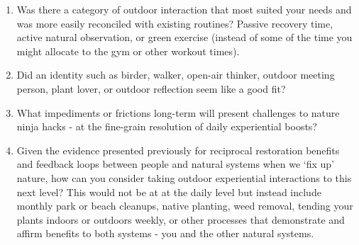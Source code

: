\documentclass[
]{book}
\providecommand{\tightlist}{%
  \setlength{\itemsep}{0pt}\setlength{\parskip}{0pt}}
\begin{document}
\begin{enumerate}
\def\labelenumi{\arabic{enumi}.}
\tightlist
\item
  Was there a category of outdoor interaction that most suited your needs and was more easily reconciled with existing routines? Passive recovery time, active natural observation, or green exercise (instead of some of the time you might allocate to the gym or other workout times).\\
\item
  Did an identity such as birder, walker, open-air thinker, outdoor meeting person, plant lover, or outdoor reflection seem like a good fit?\\
\item
  What impediments or frictions long-term will present challenges to nature ninja hacks - at the fine-grain resolution of daily experiential boosts?\\
\item
  Given the evidence presented previously for reciprocal restoration benefits and feedback loops between people and natural systems when we `fix up' nature, how can you consider taking outdoor experiential interactions to this next level? This would not be at at the daily level but instead include monthly park or beach cleanups, native planting, weed removal, tending your plants indoors or outdoors weekly, or other processes that demonstrate and affirm benefits to both systems - you and the other natural systems.
\end{enumerate}

  
\end{document}

